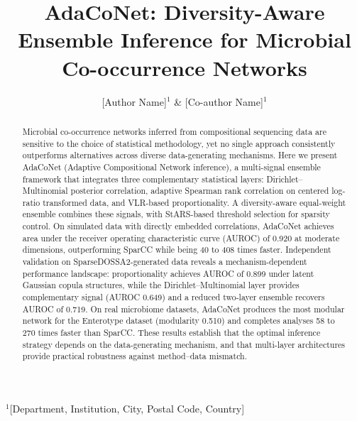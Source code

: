 \documentclass[fleqn]{nature}
\begin{document}
\title{AdaCoNet: Diversity-Aware Ensemble Inference for Microbial Co-occurrence Networks}

\author{[Author Name]$^{1}$ \& [Co-author Name]$^{1}$}

\begin{affiliations}
$^{1}$[Department, Institution, City, Postal Code, Country]
\end{affiliations}

\maketitle

\begin{abstract}
Microbial co-occurrence networks inferred from compositional sequencing data are sensitive to the choice of statistical methodology, yet no single approach consistently outperforms alternatives across diverse data-generating mechanisms.
Here we present AdaCoNet (Adaptive Compositional Network inference), a multi-signal ensemble framework that integrates three complementary statistical layers: Dirichlet--Multinomial posterior correlation, adaptive Spearman rank correlation on centered log-ratio transformed data, and VLR-based proportionality.
A diversity-aware equal-weight ensemble combines these signals, with StARS-based threshold selection for sparsity control.
On simulated data with directly embedded correlations, AdaCoNet achieves area under the receiver operating characteristic curve (AUROC) of 0.920 at moderate dimensions, outperforming SparCC while being 40 to 408 times faster.
Independent validation on SparseDOSSA2-generated data reveals a mechanism-dependent performance landscape: proportionality achieves AUROC of 0.899 under latent Gaussian copula structures, while the Dirichlet--Multinomial layer provides complementary signal (AUROC 0.649) and a reduced two-layer ensemble recovers AUROC of 0.719.
On real microbiome datasets, AdaCoNet produces the most modular network for the Enterotype dataset (modularity 0.510) and completes analyses 58 to 270 times faster than SparCC.
These results establish that the optimal inference strategy depends on the data-generating mechanism, and that multi-layer architectures provide practical robustness against method--data mismatch.
\end{abstract}


\end{document}
